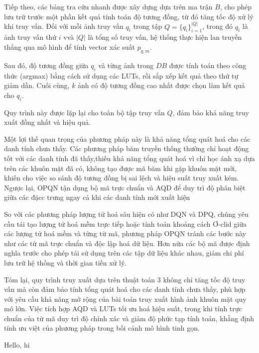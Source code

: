 Tiếp theo, các bảng tra cứu nhanh được xây dựng dựa trên ma trận $B$, cho phép lưu trữ trước một phần kết quả tính toán độ tương đồng, từ đó tăng tốc độ xử lý khi truy vấn. Đối với mỗi ảnh truy vấn $q_i$ trong tập $Q = \{q_i\}_{i=1}^{|Q|} $, trong đó $q_i$ là ảnh truy vấn thứ $i$ vvà $|Q|$ là tổng số truy vấn, hệ thống thực hiện lan truyền thẳng qua mô hình để tính vector xác suất $p_{q,m}$. 

Sau đó, độ tương đồng giữa $q_i$ và từng ảnh trong $DB$ được tính toán theo công thức (argmax) bằng cách sử dụng các LUTs, rồi sắp xếp kết quả theo thứ tự giảm dần. Cuối cùng, $k$ ảnh có độ tương đồng cao nhất được chọn làm kết quả cho $q_i$. 

Quy trình này được lặp lại cho toàn bộ tập truy vấn $Q$, đảm bảo khả năng truy xuất đồng nhất và hiệu quả.

Một lợi thế quan trọng của phương pháp này là khả năng tổng quát hoá cho các danh tính chưa thấy. Các phương pháp băm truyền thống thường chỉ hoạt động tốt với các danh tính đã thấy,thiếu khả năng tổng quát hoá vì chỉ học ánh xạ dựa trên các khuôn mặt đã có, không tạo được mã băm khi gặp khuôn mặt mới, khiến cho việc so sánh độ tương đồng bị sai lệch và hiệu suất truy xuất kém. Ngược lại, OPQN tận dụng bộ mã trực chuẩn và AQD để duy trì độ phân biệt giữa các đặcc trưng ngay cả khi các danh tính mới xuất hiện

So với các phương pháp lượng tử hoá sâu hiện có như DQN và DPQ, chúng yêu cầu tái tạo lượng tử hoá mềm trực tiếp hoặc tính toán khoảng cách Ơ-clid giữa các lượng tử hoá mềm và từng từ mã, phương pháp OPQN tránh các bước này như các từ mã trực chuẩn và độc lập hoá dữ liệu. Hơn nữa các bộ mã được định nghĩa trước cho phép tái sử dụng trên các tập dữ liệu khác nhau, giảm chi phí lưu trữ hệ thống và thời gian tiền xử lý.

Tóm lại, quy trình truy xuất dựa trên thuật toán 3 không chỉ tăng tốc độ truy vấn mà còn đảm bảo tính tổng quát hoá cho các danh tính chưa thấy, phù hợp với yêu cầu khả năng mở rộng của bài toán truy xuất hình ảnh khuôn mặt quy mô lớn. Việc tích hợp AQD và LUTs tối ưu hoá hiệu suất, trong khi tính trực chuẩn của từ mã duy trì độ chính xác và giảm độ phức tạp tính toán, khằng định tính ưu việt của phương pháp trong bối cảnh mô hình tinh gọn.

Hello, hi
